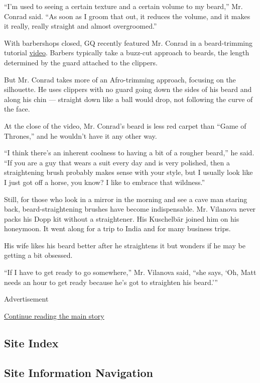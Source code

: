 ``I'm used to seeing a certain texture and a certain volume to my
beard,'' Mr. Conrad said. ``As soon as I groom that out, it reduces the
volume, and it makes it really, really straight and almost
overgroomed.''

With barbershops closed, GQ recently featured Mr. Conrad in a
beard-trimming tutorial
\href{https://www.youtube.com/watch?v=nVY_hvAkmSY\&list=PLtJOh1iZIPQFPE0OReKe32vDZ0cinajkt}{video}.
Barbers typically take a buzz-cut approach to beards, the length
determined by the guard attached to the clippers.

But Mr. Conrad takes more of an Afro-trimming approach, focusing on the
silhouette. He uses clippers with no guard going down the sides of his
beard and along his chin --- straight down like a ball would drop, not
following the curve of the face.

At the close of the video, Mr. Conrad's beard is less red carpet than
``Game of Thrones,'' and he wouldn't have it any other way.

``I think there's an inherent coolness to having a bit of a rougher
beard,'' he said. ``If you are a guy that wears a suit every day and is
very polished, then a straightening brush probably makes sense with your
style, but I usually look like I just got off a horse, you know? I like
to embrace that wildness.''

Still, for those who look in a mirror in the morning and see a cave man
staring back, beard-straightening brushes have become indispensable. Mr.
Vilanova never packs his Dopp kit without a straightener. His Kuschelbär
joined him on his honeymoon. It went along for a trip to India and for
many business trips.

His wife likes his beard better after he straightens it but wonders if
he may be getting a bit obsessed.

``If I have to get ready to go somewhere,'' Mr. Vilanova said, ``she
says, `Oh, Matt needs an hour to get ready because he's got to
straighten his beard.'''

Advertisement

\protect\hyperlink{after-bottom}{Continue reading the main story}

\hypertarget{site-index}{%
\subsection{Site Index}\label{site-index}}

\hypertarget{site-information-navigation}{%
\subsection{Site Information
Navigation}\label{site-information-navigation}}

